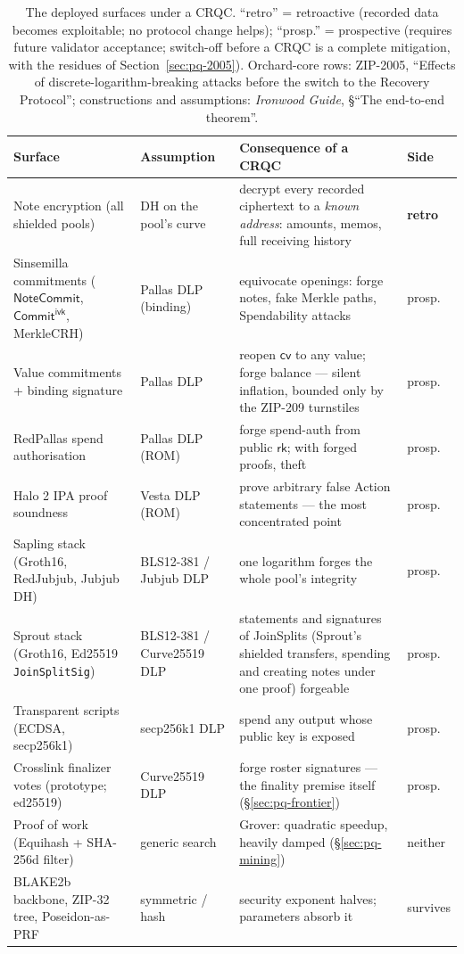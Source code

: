 \documentclass[11pt,a4paper]{article}
\theoremstyle{definition}
\newcommand{\cvsym}{\mathsf{cv}}
\newcommand{\rk}{\mathsf{rk}}
\newcommand{\NoteCommit}{\ensuremath{\mathsf{NoteCommit}}}
\newcommand{\CommitIvk}{\ensuremath{\mathsf{Commit}^{\mathsf{ivk}}}}
\begin{document}
\begin{table}[ht]
\centering
\footnotesize
\setlength{\tabcolsep}{4pt}
\begin{tabular}{@{}p{3.4cm}p{3.2cm}p{5.6cm}l@{}}
\toprule
Surface & Assumption & Consequence of a CRQC & Side \\
\midrule
Note encryption (all shielded pools) & DH on the pool's curve &
decrypt every recorded ciphertext to a \emph{known address}: amounts,
memos, full receiving history & \textbf{retro} \\
\addlinespace[2pt]
Sinsemilla commitments (\NoteCommit, \CommitIvk, MerkleCRH) & Pallas
DLP (binding) & equivocate openings: forge notes, fake Merkle paths,
Spendability attacks & prosp. \\
Value commitments + binding signature & Pallas DLP & reopen
$\cvsym$ to any value; forge balance --- silent inflation, bounded only
by the ZIP-209 turnstiles & prosp. \\
RedPallas spend authorisation & Pallas DLP (ROM) & forge spend-auth
from public $\rk$; with forged proofs, theft & prosp. \\
Halo 2 IPA proof soundness & Vesta DLP (ROM) & prove arbitrary false
Action statements --- the most concentrated point & prosp. \\
Sapling stack (Groth16, RedJubjub, Jubjub DH) & BLS12-381 / Jubjub
DLP & one logarithm forges the whole pool's integrity & prosp. \\
Sprout stack (Groth16, Ed25519 \texttt{JoinSplitSig}) & BLS12-381 /
Curve25519 DLP & statements and signatures of JoinSplits (Sprout's
shielded transfers, spending and creating notes under one proof)
forgeable & prosp. \\
Transparent scripts (ECDSA, secp256k1) & secp256k1 DLP & spend any
output whose public key is exposed & prosp. \\
Crosslink finalizer votes (prototype; ed25519) & Curve25519 DLP &
forge roster signatures --- the finality premise itself
(\S\ref{sec:pq-frontier}) & prosp. \\
\addlinespace[2pt]
Proof of work (Equihash + SHA-256d filter) & generic search & Grover:
quadratic speedup, heavily damped (\S\ref{sec:pq-mining}) & neither \\
BLAKE2b backbone, ZIP-32 tree, Poseidon-as-PRF & symmetric / hash &
security exponent halves; parameters absorb it & survives \\
\bottomrule
\end{tabular}
\caption{The deployed surfaces under a CRQC. ``retro'' = retroactive
(recorded data becomes exploitable; no protocol change helps);
``prosp.'' = prospective (requires future validator acceptance;
switch-off before a CRQC is a complete mitigation, with the residues of
Section~\ref{sec:pq-2005}). Orchard-core rows: ZIP-2005, ``Effects of
discrete-logarithm-breaking attacks before the switch to the Recovery
Protocol''; constructions and assumptions: \emph{Ironwood Guide},
\S``The end-to-end theorem''.}
\label{tab:pq-inventory}
\end{table}
\end{document}
